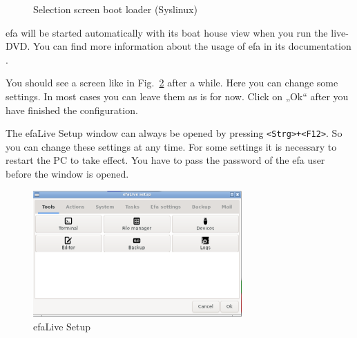 \documentclass[a4paper,12pt,twoside]{article}
\begin{document}
\begin{figure}
    \centering
    \caption{Selection screen boot loader (Syslinux)}
    \label{fig:syslinux}
\end{figure}

efa will be started automatically with its boat house view when you run
the live-DVD. You can find more information about the usage of efa in
its documentation \cite{EFA2}.

You should see a screen like in Fig.~\ref{fig:efalivesetup_live} after a while.
Here you can change some settings. In most cases you can leave them as is for now. 
Click on „Ok“ after you have finished the configuration.

The efaLive Setup window can always be opened by pressing
\texttt{{\textless}Strg{\textgreater}+{\textless}F12{\textgreater}}. So you can
change these settings at any time. For some settings it is necessary to
restart the PC to take effect. You have to pass the password of the efa
user before the window is opened.

\begin{figure}
    \centering
    \includegraphics[width=8cm]{screenshots/efalive_setup.png}
    \caption{efaLive Setup}
    \label{fig:efalivesetup_live}
\end{figure}
\end{document}
